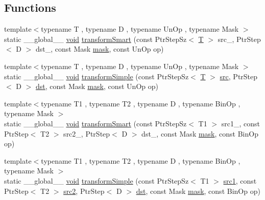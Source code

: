 \subsection*{Functions}
\begin{DoxyCompactItemize}
\item 
{\footnotesize template$<$typename T , typename D , typename Un\-Op , typename Mask $>$ }\\static \-\_\-\-\_\-global\-\_\-\-\_\- \hyperlink{legacy_8hpp_a8bb47f092d473522721002c86c13b94e}{void} \hyperlink{namespacecv_1_1gpu_1_1device_1_1transform__detail_a1e6c00f77e187e8927ed0422605baade}{transform\-Smart} (const Ptr\-Step\-Sz$<$ \hyperlink{calib3d_8hpp_a3efb9551a871ddd0463079a808916717}{T} $>$ src\-\_\-, Ptr\-Step$<$ D $>$ dst\-\_\-, const Mask \hyperlink{tracking_8hpp_a6b13ecd2fd6ec7ad422f1d7863c3ad19}{mask}, const Un\-Op op)
\item 
{\footnotesize template$<$typename T , typename D , typename Un\-Op , typename Mask $>$ }\\static \-\_\-\-\_\-global\-\_\-\-\_\- \hyperlink{legacy_8hpp_a8bb47f092d473522721002c86c13b94e}{void} \hyperlink{namespacecv_1_1gpu_1_1device_1_1transform__detail_ae4e08132e59457833e15708710e80aec}{transform\-Simple} (const Ptr\-Step\-Sz$<$ \hyperlink{calib3d_8hpp_a3efb9551a871ddd0463079a808916717}{T} $>$ \hyperlink{legacy_8hpp_a371cd109b74033bc4366f584edd3dacc}{src}, Ptr\-Step$<$ D $>$ \hyperlink{photo__c_8h_aed13e2a25279b24dc954073233fef7a5}{dst}, const Mask \hyperlink{tracking_8hpp_a6b13ecd2fd6ec7ad422f1d7863c3ad19}{mask}, const Un\-Op op)
\item 
{\footnotesize template$<$typename T1 , typename T2 , typename D , typename Bin\-Op , typename Mask $>$ }\\static \-\_\-\-\_\-global\-\_\-\-\_\- \hyperlink{legacy_8hpp_a8bb47f092d473522721002c86c13b94e}{void} \hyperlink{namespacecv_1_1gpu_1_1device_1_1transform__detail_a704230bb3a0f6234eb4c7d51b8e1092e}{transform\-Smart} (const Ptr\-Step\-Sz$<$ T1 $>$ src1\-\_\-, const Ptr\-Step$<$ T2 $>$ src2\-\_\-, Ptr\-Step$<$ D $>$ dst\-\_\-, const Mask \hyperlink{tracking_8hpp_a6b13ecd2fd6ec7ad422f1d7863c3ad19}{mask}, const Bin\-Op op)
\item 
{\footnotesize template$<$typename T1 , typename T2 , typename D , typename Bin\-Op , typename Mask $>$ }\\static \-\_\-\-\_\-global\-\_\-\-\_\- \hyperlink{legacy_8hpp_a8bb47f092d473522721002c86c13b94e}{void} \hyperlink{namespacecv_1_1gpu_1_1device_1_1transform__detail_af429c0b72424a6de1bf87ac9b9088a94}{transform\-Simple} (const Ptr\-Step\-Sz$<$ T1 $>$ \hyperlink{core__c_8h_a897de4702c922f4cccda0d57ccdcafb3}{src1}, const Ptr\-Step$<$ T2 $>$ \hyperlink{core__c_8h_a7561a36d48069d54a6c8ac4e4750edfd}{src2}, Ptr\-Step$<$ D $>$ \hyperlink{photo__c_8h_aed13e2a25279b24dc954073233fef7a5}{dst}, const Mask \hyperlink{tracking_8hpp_a6b13ecd2fd6ec7ad422f1d7863c3ad19}{mask}, const Bin\-Op op)
\end{DoxyCompactItemize}


